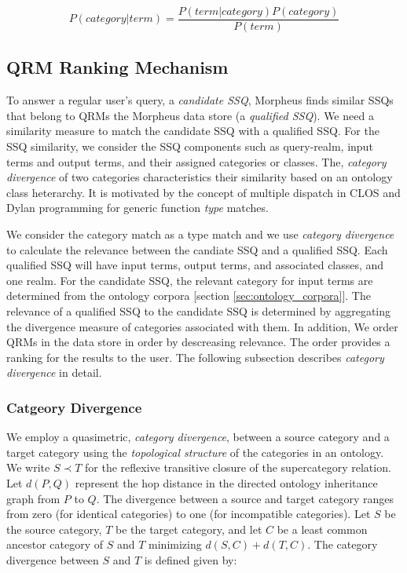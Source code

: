 \begin{equation}
\label{eq:bayesrule}
P (category | term) = \frac{P(term | category) P(category)}{P(term)}
\end{equation}    



\subsection{QRM Ranking Mechanism} 
\label{sec:qrm_ranking}

To answer a regular user's query, a \textit{candidate
SSQ}, Morpheus finds similar SSQs that belong to QRMs the Morpheus data store (a
\textit{qualified SSQ}). We need a similarity measure to match the candidate SSQ
with a qualified SSQ. For the SSQ similarity, we
consider the SSQ components such as query-realm, input
terms and output terms, and their assigned categories or classes. The,
\textit{category divergence} of two categories characteristics their 
similarity based on an ontology class heterarchy. 
It is motivated by the concept of multiple
dispatch in CLOS \cite{Steele1990} and Dylan programming \cite{Barrett1996} for
generic function \emph{type} matches. 

We consider the category match as a type match and we use \emph{category divergence} 
to calculate the relevance between the candiate SSQ
and a qualified SSQ. Each qualified SSQ will
have input terms, output terms, and associated classes, and one realm. For the
candidate SSQ, the relevant category for input terms are determined from the
ontology corpora [section \ref{sec:ontology_corpora}]. The relevance 
of a qualified SSQ to the candidate SSQ is determined by
aggregating the divergence measure of categories associated with them. In addition, 
We order QRMs in the data store in order by descreasing relevance. 
The order provides a ranking for the results to the user. 
The following subsection describes \emph{category divergence} in detail.

\subsubsection{Catgeory Divergence}
\label{sec:ctd}

We employ a quasimetric, \textit{category
divergence},
between a source category and a target category using the \textit{topological
structure} of the categories in an ontology. We write $S \prec T$ for the
reflexive
transitive closure of the supercategory relation. Let $d(P,Q)$ represent the hop
distance in the directed ontology inheritance graph from $P$ to $Q$. The
divergence between a source and target category ranges from zero (for identical
categories) to one (for incompatible categories). Let $S$ be the source
category, $T$ be
the target category, and let $C$ be a least common ancestor category of $S$ and
$T$
minimizing $d(S,C) + d(T,C)$. The category divergence between $S$ and $T$ is
defined given by:

